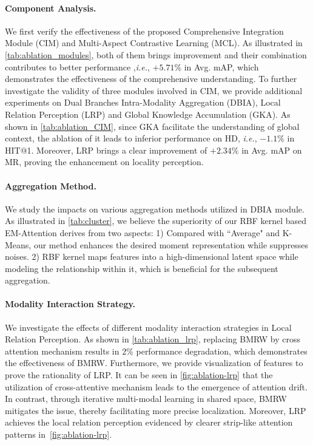 \paragraph{Component Analysis.}
We first verify the effectiveness of the proposed Comprehensive Integration Module (CIM) and Multi-Aspect Contrastive Learning (MCL).
As illustrated in \cref{tab:ablation_modules}, both of them brings improvement and their combination contributes to better performance ,\textit{i.e.}, $+5.71$\% in Avg. mAP, which demonstrates the effectiveness of the comprehensive understanding.
To further investigate the validity of three modules involved in CIM, we provide additional experiments on Dual Branches Intra-Modality Aggregation (DBIA), Local Relation Perception (LRP) and Global Knowledge Accumulation (GKA).  
As shown in \cref{tab:ablation_CIM}, since GKA facilitate the understanding of global context, the ablation of it leads to inferior performance on HD, \textit{i.e.}, $-1.1\%$ in HIT@1. Moreover, LRP brings a clear improvement of $+2.34\%$ in Avg. mAP on MR, proving the enhancement on locality perception.  

\vspace{-12pt}
\paragraph{Aggregation Method.}
We study the impacts on various aggregation methods utilized in DBIA module.
As illustrated in \cref{tab:cluster}, we believe the superiority of our RBF kernel based EM-Attention derives from two aspects: 1) Compared with ``Average" and K-Means, our method
enhances the desired moment representation while suppresses noises.
2) RBF kernel maps features into a high-dimensional latent space while modeling the relationship within it, which is beneficial for the subsequent aggregation.

\vspace{-12pt}
\paragraph{Modality Interaction Strategy.}
We investigate the effects of different modality interaction strategies in Local Relation Perception. As shown in \cref{tab:ablation_lrp}, replacing BMRW by cross attention mechanism results in $2\%$ performance degradation, which demonstrates the effectiveness of BMRW.
Furthermore, we provide visualization of features to prove the rationality of LRP. It can be seen in \cref{fig:ablation-lrp} that the utilization of cross-attentive mechanism leads to the emergence of attention drift. In contrast, through iterative multi-modal learning in shared space, BMRW mitigates the issue, thereby facilitating more precise localization.
Moreover, LRP achieves the local relation perception evidenced by clearer strip-like attention patterns in~\cref{fig:ablation-lrp}.

